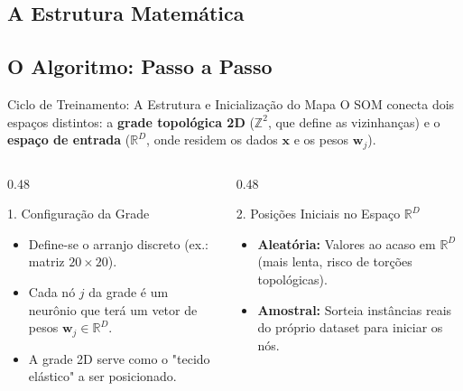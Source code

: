 \documentclass[aspectratio=169]{beamer}
\begin{document}
	\subsection{A Estrutura Matemática}
	\subsection{O Algoritmo: Passo a Passo}
	
	\begin{frame}{Ciclo de Treinamento: A Estrutura e Inicialização do Mapa}
		O SOM conecta dois espaços distintos: a \textbf{grade topológica 2D} ($\mathbb{Z}^2$, que define as vizinhanças) e o \textbf{espaço de entrada} ($\mathbb{R}^D$, onde residem os dados $\mathbf{x}$ e os pesos $\mathbf{w}_j$).
		
		\vspace{0.2cm}
		
		\begin{columns}[T]
			\begin{column}{0.48\textwidth}
				\begin{block}{1. Configuração da Grade}
					\begin{itemize}
						\item Define-se o arranjo discreto (ex.: matriz $20 \times 20$).
						\item Cada nó $j$ da grade é um neurônio que terá um vetor de pesos $\mathbf{w}_j \in \mathbb{R}^D$.
						\item A grade 2D serve como o "tecido elástico" a ser posicionado.
					\end{itemize}
				\end{block}
			\end{column}
			
			\begin{column}{0.48\textwidth}
				\begin{block}{2. Posições Iniciais no Espaço $\mathbb{R}^D$}
					\begin{itemize}
						\item \textbf{Aleatória:} Valores ao acaso em $\mathbb{R}^D$ (mais lenta, risco de torções topológicas).
						\item \textbf{Amostral:} Sorteia instâncias reais do próprio dataset para iniciar os nós.
					\end{itemize}
				\end{block}
			\end{column}
		\end{columns}
	\end{frame}
	
\end{document}

